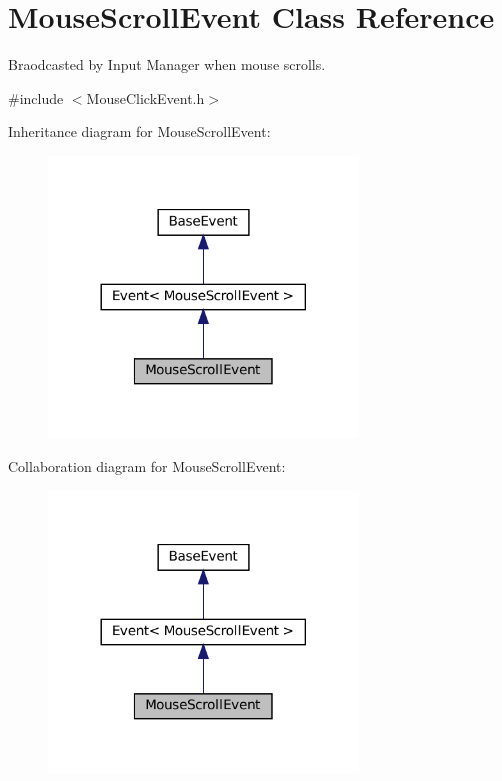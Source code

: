 \hypertarget{classMouseScrollEvent}{}\section{Mouse\+Scroll\+Event Class Reference}
\label{classMouseScrollEvent}


Braodcasted by Input Manager when mouse scrolls.  




{\ttfamily \#include $<$Mouse\+Click\+Event.\+h$>$}



Inheritance diagram for Mouse\+Scroll\+Event\+:\nopagebreak
\begin{figure}[H]
\begin{center}
\leavevmode
\includegraphics[width=233pt]{classMouseScrollEvent__inherit__graph}
\end{center}
\end{figure}


Collaboration diagram for Mouse\+Scroll\+Event\+:\nopagebreak
\begin{figure}[H]
\begin{center}
\leavevmode
\includegraphics[width=233pt]{classMouseScrollEvent__coll__graph}
\end{center}
\end{figure}
